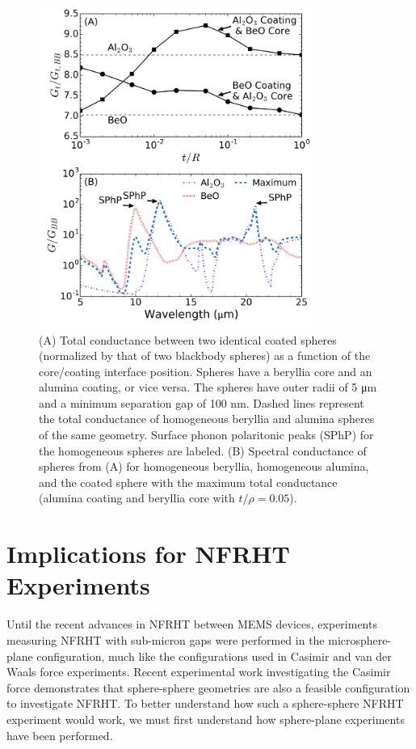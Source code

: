\begin{figure}
\centering
\includegraphics[width=0.8\textwidth]{./Figures/figure4.png}
\caption{\label{fig:TwoDielectrics} (A) Total conductance between two identical coated spheres (normalized by that of two blackbody spheres) as a function of the core/coating interface position. Spheres have a beryllia core and an alumina coating, or vice versa. The spheres have outer radii of 5 \si{\micro\meter} and a minimum separation gap of 100 nm. Dashed lines represent the total conductance of homogeneous beryllia and alumina spheres of the same geometry. Surface phonon polaritonic peaks (SPhP) for the homogeneous spheres are labeled. (B) Spectral conductance of spheres from (A) for homogeneous beryllia, homogeneous alumina, and the coated sphere with the maximum total conductance (alumina coating and beryllia core with $t/\rho=0.05$).}
\end{figure}
\section{Implications for NFRHT Experiments}
%
Until the recent advances in NFRHT between MEMS devices,\cite{Song2016, Cui2017, Fiorino2018} experiments measuring NFRHT with sub-micron gaps were performed in the microsphere-plane configuration, much like the configurations used in Casimir and van der Waals force experiments.\cite{Lamoreaux1997, Mohideen1998, Roy1999, Harris2000} Recent experimental work investigating the Casimir force\cite{Garrett2018} demonstrates that sphere-sphere geometries are also a feasible configuration to investigate NFRHT. To better understand how such a sphere-sphere NFRHT experiment would work, we must first understand how sphere-plane experiments have been performed.

